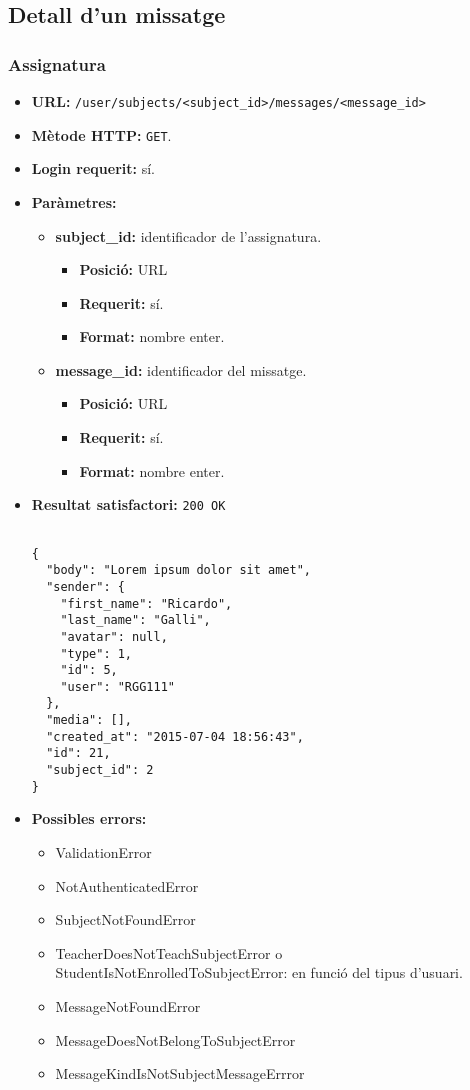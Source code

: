 \subsection{Detall d'un missatge}

	\subsubsection{Assignatura}
	\begin{itemize}
\item \textbf{\ac{URL}:} \texttt{/user/subjects/<subject\_id>/messages/<message\_id>}
\item \textbf{Mètode \ac{HTTP}: } \texttt{GET}.
\item \textbf{Login requerit:} sí.
\item \textbf{Paràmetres:}
	\begin{itemize}
		\item \textbf{subject\_id:} identificador de l'assignatura.
		\begin{itemize}
			\item \textbf{Posició:} \ac{URL}
			\item \textbf{Requerit:} sí.
			\item \textbf{Format:} nombre enter.
		\end{itemize}
		\item \textbf{message\_id:} identificador del missatge.
		\begin{itemize}
			\item \textbf{Posició:} \ac{URL}
			\item \textbf{Requerit:} sí.
			\item \textbf{Format:} nombre enter.
		\end{itemize}
	\end{itemize}
\item \textbf{Resultat satisfactori:} \texttt{200 OK}
	\begin{verbatim}
	
{
  "body": "Lorem ipsum dolor sit amet",
  "sender": {
    "first_name": "Ricardo",
    "last_name": "Galli",
    "avatar": null,
    "type": 1,
    "id": 5,
    "user": "RGG111"
  },
  "media": [],
  "created_at": "2015-07-04 18:56:43",
  "id": 21,
  "subject_id": 2
}
	\end{verbatim}
\item \textbf{Possibles errors:}
	\begin{itemize}
		\item ValidationError
		\item NotAuthenticatedError
		\item SubjectNotFoundError
		\item TeacherDoesNotTeachSubjectError o StudentIsNotEnrolledToSubjectError: en funció del tipus d'usuari.
		\item MessageNotFoundError
		\item MessageDoesNotBelongToSubjectError
		\item MessageKindIsNotSubjectMessageErrror

	\end{itemize}

	\end{itemize}
	
